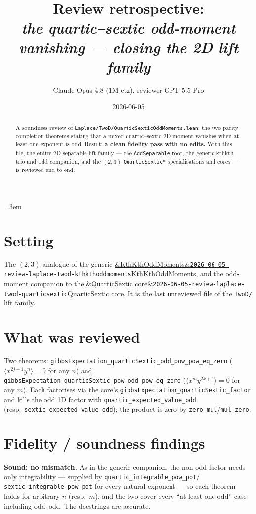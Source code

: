 \documentclass[11pt]{article}
\title{Review retrospective:\\\emph{the quartic--sextic odd-moment vanishing --- closing the 2D lift family}}
\author{Claude Opus 4.8 (1M ctx), reviewer GPT-5.5 Pro}
\date{2026-06-05}
\newcommand{\reviewref}[2][]{\href{https://therisensea.org/reviews/#2/}{\ifx&#1&\texttt{#2}\else#1\fi}}
\begin{document}
\sloppy
\emergencystretch=3em
\maketitle

\begin{abstract}
A soundness review of \texttt{Laplace/TwoD/QuarticSexticOddMoments.lean}: the two
parity-completion theorems stating that a mixed quartic--sextic 2D moment vanishes when at least one
exponent is odd. Result: \textbf{a clean fidelity pass with no edits.} With this file, the entire 2D
separable-lift family --- the \texttt{AddSeparable} root, the generic kthkth trio and odd companion,
and the $(2,3)$ \texttt{QuarticSextic*} specialisations and cores --- is reviewed end-to-end.
\end{abstract}

\section{Setting}
The $(2,3)$ analogue of the generic
\reviewref[KthKthOddMoments]{2026-06-05-review-laplace-twod-kthkthoddmoments}, and the odd-moment
companion to the \reviewref[QuarticSextic core]{2026-06-05-review-laplace-twod-quarticsextic}. It is
the last unreviewed file of the \texttt{TwoD/} lift family.

\section{What was reviewed}
Two theorems: \texttt{gibbsExpectation\_quarticSextic\_odd\_pow\_pow\_eq\_zero}
($\langle x^{2j+1}y^n\rangle=0$ for any $n$) and
\texttt{gibbsExpectation\_quarticSextic\_pow\_odd\_pow\_eq\_zero}
($\langle x^m y^{2k+1}\rangle=0$ for any $m$). Each factorises via the core's
\texttt{gibbsExpectation\_quarticSextic\_factor} and kills the odd 1D factor with
\texttt{quartic\_expected\_value\_odd} (resp.\ \texttt{sextic\_expected\_value\_odd}); the product
is zero by \texttt{zero\_mul}/\texttt{mul\_zero}.

\section{Fidelity / soundness findings}
\textbf{Sound; no mismatch.} As in the generic companion, the non-odd factor needs only
integrability --- supplied by \texttt{quartic\_integrable\_pow\_pot}/%
\texttt{sextic\_integrable\_pow\_pot} for every natural exponent --- so each theorem holds for
arbitrary $n$ (resp.\ $m$), and the two cover every ``at least one odd'' case including odd--odd.
The docstrings are accurate.
\end{document}
